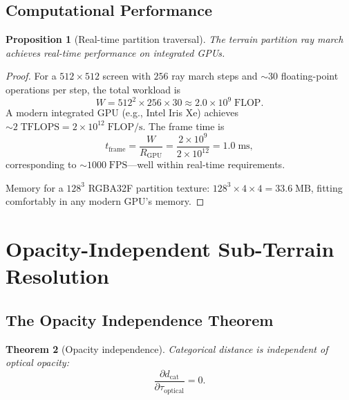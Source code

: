 \documentclass[10pt,twocolumn]{article}
\newtheorem{theorem}{Theorem}[section]
\newtheorem{proposition}[theorem]{Proposition}
\theoremstyle{definition}
\theoremstyle{remark}
\newcommand{\dcat}{d_{\mathrm{cat}}}
\newcommand{\topt}{\tau_{\mathrm{optical}}}
\begin{document}
\subsection{Computational Performance}\label{sec:perf}

\begin{proposition}[Real-time partition traversal]
\label{prop:perf}
The terrain partition ray march achieves real-time performance
on integrated GPUs.
\end{proposition}

\begin{proof}
For a $512\times 512$ screen with $256$ ray march steps and
$\sim 30$ floating-point operations per step, the total
workload is
\begin{equation}
  W = 512^2\times 256\times 30 \approx 2.0\times 10^9
  \;\mathrm{FLOP}.
\end{equation}
A modern integrated GPU (e.g., Intel Iris Xe) achieves
$\sim 2\;\mathrm{TFLOPS} = 2\times 10^{12}\;\mathrm{FLOP/s}$.
The frame time is
\begin{equation}
  t_{\mathrm{frame}} = \frac{W}{R_{\mathrm{GPU}}}
  = \frac{2\times 10^9}{2\times 10^{12}}
  = 1.0\;\mathrm{ms},
\end{equation}
corresponding to $\sim 1000\;\mathrm{FPS}$---well within
real-time requirements.

Memory for a $128^3$ RGBA32F partition texture:
$128^3\times 4\times 4 = 33.6\;\mathrm{MB}$, fitting
comfortably in any modern GPU's memory.
\end{proof}

\section{Opacity-Independent Sub-Terrain Resolution}
\label{sec:opacity}

\subsection{The Opacity Independence Theorem}
\label{sec:opacity_thm}

\begin{theorem}[Opacity independence]\label{thm:opacity}
Categorical distance is independent of optical opacity:
\begin{equation}\label{eq:opacity_thm}
  \frac{\partial\dcat}{\partial\topt} = 0.
\end{equation}
\end{theorem}
\end{document}
